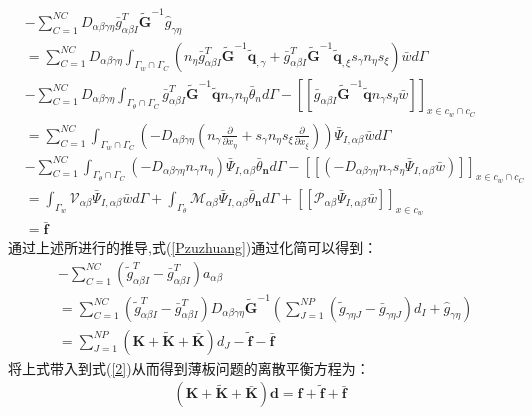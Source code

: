 \begin{equation}
 \begin{split}
    &-\sum_{C=1}^{N\!C}D_{\alpha\beta\gamma\eta}\bar{g}_{\alpha\beta I}^T\tilde{\pmb G}^{-1}\hat{g}_{\gamma\eta }\\
    &=\sum_{C=1}^{N\!C}D_{\alpha\beta\gamma\eta}\int_{{\Gamma_w}\cap{\Gamma_C}}(n_{\eta}
    \bar{g}_{\alpha\beta I}^T\tilde{\pmb G}^{-1}\tilde{\pmb q}_{,\gamma}+\bar{g}_{\alpha\beta I}^T
    \tilde{\pmb G}^{-1}\tilde{\pmb q}_{,\xi}s_{\gamma}n_{\eta}s_{\xi})\bar{w}d\Gamma\\
    &-\sum_{C=1}^{N\!C}D_{\alpha\beta\gamma\eta}\int_{{\Gamma_{\theta}}\cap{\Gamma_{C}}}\bar{g}^T_{\alpha\beta I}\tilde{\pmb G}^{-1}\tilde{\pmb q}n_{\gamma}n_{\eta}\bar{\theta}_nd\Gamma-[[\bar{g}_{\alpha\beta I}\tilde{\pmb G}^{-1}\tilde{\pmb q}n_{\gamma}s_{\eta}\bar{w}]]_{x\in{c_w}\cap{c_C}}\\
    &=\sum_{C=1}^{N\!C}\int_{{\Gamma_w}\cap{\Gamma_C}}(-D_{\alpha\beta\gamma\eta}(n_{\gamma}\frac{\partial}{\partial x_{\eta}}+s_{\gamma}n_{\eta}s_{\xi}\frac{\partial}{\partial x_{\xi}}))\bar{\Psi}_{I,\alpha\beta}\bar{w}d\Gamma\\
    &-\sum_{C=1}^{N\!C}\int_{{\Gamma_{\theta}}\cap{\Gamma_C}}(-D_{\alpha\beta\gamma\eta}n_{\gamma}n_{\eta})\bar{\Psi}_{I,\alpha\beta}\bar{\theta}_{\pmb n}d\Gamma-[[(-D_{\alpha\beta\gamma\eta}n_{\gamma}s_{\eta}\bar{\Psi}_{I,\alpha\beta}\bar{w})]]_{x\in{c_w}\cap{c_C}}\\
    &=\int_{\Gamma_w}\mathcal{V}_{\alpha\beta}\bar{\Psi}_{I,\alpha\beta}\bar{w}d\Gamma+\int_{\Gamma_{\theta}}\mathcal{M}_{\alpha\beta}\bar{\Psi}_{I,\alpha\beta}\bar{\theta}_{\pmb n}d\Gamma+[[\mathcal{P}_{\alpha\beta}\bar{\Psi}_{I,\alpha\beta}\bar{w}]]_{x\in{c_w}}\\
    &=\bar{\pmb f}
\end{split}
\end{equation}
通过上述所进行的推导,式(\ref{Pzuzhuang})通过化简可以得到：
\begin{equation}
\begin{split}
    &-\sum_{C=1}^{N\!C}(\tilde{g}_{\alpha\beta I}^T-\bar{g}_{\alpha\beta I}^T)a_{\alpha\beta}\\
    &=\sum_{C=1}^{N\!C}(\tilde{g}_{\alpha\beta I}^T-\bar{g}_{\alpha\beta I}^T)D_{\alpha\beta\gamma\eta}\tilde{\pmb{G}}^{-1}(\sum_{J=1}^{N\!P}(\tilde{g}_{\gamma\eta J}-\bar{g}_{\gamma\eta J})d_I+\hat{g}_{\gamma\eta})\\
    &=\sum_{J=1}^{N\!P}(\pmb{K}+\tilde{\pmb K}+\bar{\pmb K})d_J-\tilde{\pmb f}-\bar{\pmb f}
\end{split}
\end{equation}
将上式带入到式(\ref{2})从而得到薄板问题的离散平衡方程为：
\begin{equation}
\begin{split}
    (\pmb{K}+\tilde{\pmb K}+\bar{\pmb K})\pmb{d}=\pmb{f}+\tilde{\pmb f}+\bar{\pmb f}
\end{split}
\end{equation}
